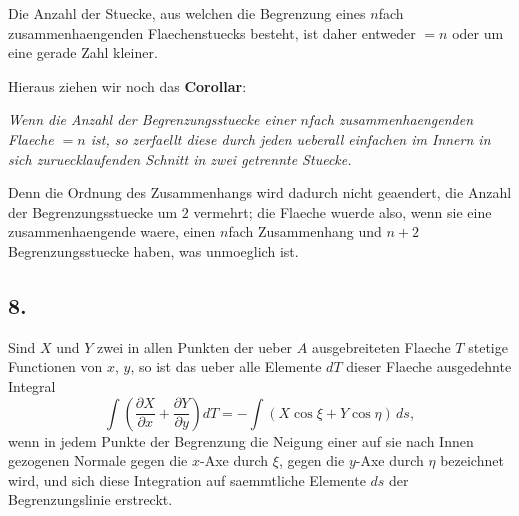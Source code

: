 \documentclass[11pt,a4paper]{article}
\theoremstyle{plain}
\theoremstyle{definition}
\begin{document}
Die Anzahl der Stuecke, aus welchen die Begrenzung eines $n$fach zusammenhaengenden Flaechenstuecks besteht, ist daher entweder $= n$ oder um eine gerade Zahl kleiner.

Hieraus ziehen wir noch das \textbf{Corollar}:

\emph{Wenn die Anzahl der Begrenzungsstuecke einer $n$fach zusammenhaengenden Flaeche $= n$ ist, so zerfaellt diese durch jeden ueberall einfachen im Innern in sich zuruecklaufenden Schnitt in zwei getrennte Stuecke.}

Denn die Ordnung des Zusammenhangs wird dadurch nicht geaendert, die Anzahl der Begrenzungsstuecke um $2$ vermehrt; die Flaeche wuerde also, wenn sie eine zusammenhaengende waere, einen $n$fach Zusammenhang und $n + 2$ Begrenzungsstuecke haben, was unmoeglich ist.

\subsection*{8.}

Sind $X$ und $Y$ zwei in allen Punkten der ueber $A$ ausgebreiteten Flaeche $T$ stetige Functionen von $x$, $y$, so ist das ueber alle Elemente $dT$ dieser Flaeche ausgedehnte Integral
\begin{equation}
\int \left(\frac{\partial X}{\partial x} + \frac{\partial Y}{\partial y}\right) dT = -\int (X \cos\xi + Y \cos\eta) \, ds,
\end{equation}
wenn in jedem Punkte der Begrenzung die Neigung einer auf sie nach Innen gezogenen Normale gegen die $x$-Axe durch $\xi$, gegen die $y$-Axe durch $\eta$ bezeichnet wird, und sich diese Integration auf saemmtliche Elemente $ds$ der Begrenzungslinie erstreckt.
\end{document}
